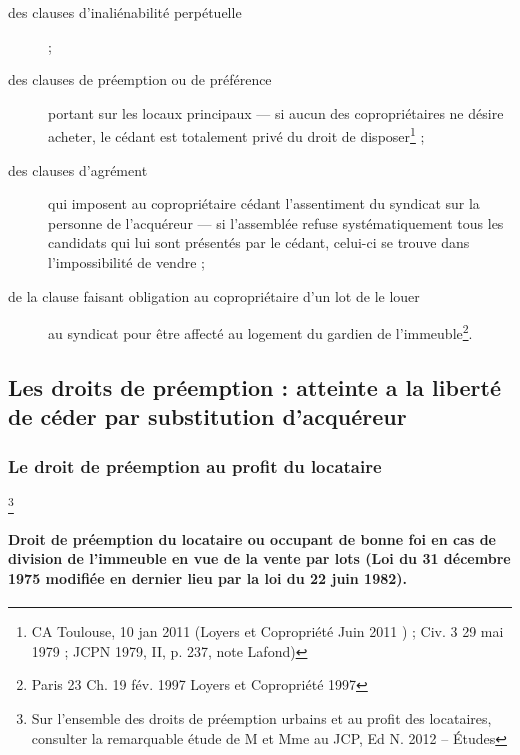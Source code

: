 			\begin{description}
				\item[des clauses d'inaliénabilité perpétuelle] ;
	
				\item[des clauses de préemption ou de préférence] portant sur les locaux principaux --- si
				aucun des copropriétaires ne désire acheter, le cédant est totalement privé du
				droit de disposer\footnote{CA Toulouse, 10 jan 2011 (Loyers et Copropriété Juin 2011 ) ; Civ. 3\ieme{} 29 mai 1979 ; JCPN 1979, II, p. 237, note Lafond)} ;
				
				\item[des clauses d'agrément] qui imposent au copropriétaire cédant l'assentiment du
				syndicat sur la personne de l'acquéreur --- si l'assemblée refuse systématiquement
				tous les candidats qui lui sont présentés par le cédant, celui-ci se trouve dans
				l'impossibilité de vendre ;
				
				\item[de la clause faisant obligation au copropriétaire d’un lot de le louer] au syndicat
				pour être affecté au logement du gardien de l’immeuble\footnote{Paris 23\ieme{} Ch. 19 fév. 1997 Loyers et Copropriété 1997 }.
			\end{description}
	
	\subsection[Les droits de préemption]{Les droits de préemption : atteinte a la liberté de céder par substitution d’acquéreur}
		
		\subsubsection{Le droit de préemption au profit du locataire}\footnote{Sur l’ensemble des droits de préemption urbains et au profit des locataires, consulter la remarquable étude de M  et Mme  au JCP, Ed N. 2012 – Études }
		
			\paragraph{Droit de préemption du locataire ou occupant de bonne foi en cas de division de l’immeuble en vue de la vente par lots (Loi  du 31 décembre 1975 modifiée en dernier lieu par la loi  du 22 juin 1982).}
			
